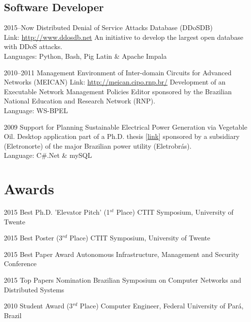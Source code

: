 \documentclass[print]{friggeri-cv-linux} %
\begin{document}
\subsection{Software Developer}
\begin{entrylist}

\entry
{2015--Now}
{Distributed Denial of Service Attacks Database (DDoSDB)}
{\\Link: \href{http://ddosdb.net}{http://www.ddosdb.net} }
{An initiative to develop the largest open database with DDoS attacks.\\
Languages: Python, Bash, Pig Latin \& Apache Impala
}

\entry
{2010--2011}
{{Management Environment of Inter-domain Circuits for Advanced Networks (MEICAN)}}
{Link: \href{http://meican.cipo.rnp.br/}{http://meican.cipo.rnp.br/}}
{Development of an Executable Network Management Policies Editor sponsored by the Brazilian National Education and Research Network (RNP).    \\
Language: WS-BPEL
}

\entry
{2009}
{Support for Planning Sustainable Electrical Power Generation via Vegetable Oil.}
{}
{Desktop application part of a Ph.D. thesis [\href{https://sites.google.com/site/ceamazonufpa/TeseAnaRosaDuarte.pdf}{link}] sponsored by a subsidiary (Eletronorte) of the major Brazilian power utility (Eletrobrás).\\
Language: C\#.Net \& mySQL
}
\end{entrylist}

\section{Awards}

\begin{entrylist}
\vspace{-0.3cm}
\entry
{2015}
{Best Ph.D. 'Elevator Pitch' (1$^{st}$ Place)}
{CTIT Symposium, University of Twente}

\vspace{-0.3cm}
\entry
{2015}
{Best Poster (3$^{rd}$ Place)}
{CTIT Symposium, University of Twente}

\vspace{-0.3cm}
\entry
{2015}
{Best Paper Award}
{Autonomous Infrastructure, Management and Security Conference}

\vspace{-0.3cm}
\entry
{2015}
{Top Papers Nomination}
{Brazilian Symposium on Computer Networks and Distributed Systems}

\vspace{-0.3cm}
\entry
{2010}
{Student Award (3$^{rd}$ Place)}
{Computer Engineer, Federal University of Pará, Brazil}

\end{entrylist}
\end{document}
